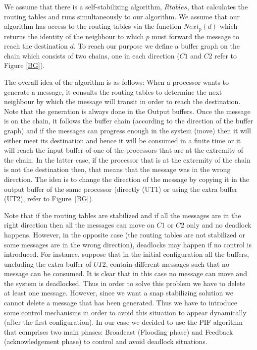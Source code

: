\documentclass{llncs}
\begin{document}
We assume that there is a self-stabilizing algorithm, $Rtables$, that calculates the routing tables and runs simultaneously to our
algorithm. We assume that our algorithm has access to the routing tables
via the function $Next_{p}(d)$ which returns the identity of the neighbour to which $p$ must forward the message to
reach the destination $d$. To reach our purpose we define a buffer graph on the chain which consists of two chains,
one in each direction ($C1$ and $C2$ refer to Figure \ref{BG}). 

The overall idea of the algorithm is as follows: When a processor wants to generate a message, it consults the routing
tables to determine the next neighbour by which the message will transit in order to reach the destination. Note that
the generation is always done in the Output buffers. Once the message is on the chain, it follows the buffer chain
(according to the direction of the buffer graph) and if the messages can progress enough in the system (move) then it
will either meet its destination and hence it will be consumed in a finite time or it will reach the input buffer of
one of the processors that are at the extremity of the chain. In the latter case, if the processor that is at the
extremity of the chain is not the destination then, that means that the message was in the wrong direction. The idea
is to change the direction of the message by copying it in the output buffer of the same processor (directly (UT1) or
using the extra buffer (UT2), refer to Figure~\ref{BG}). 

Note that if the routing tables are stabilized and if all the messages are in the right direction then all the
messages can move on $C1$ or $C2$ only and no deadlock happens. However, in the opposite case (the routing tables are not stabilized or
some messages are in the wrong direction), deadlocks may happen if no control is introduced. For instance, suppose
that in the initial configuration all the buffers, uncluding the extra buffer of $UT2$, contain different messages such that 
no message can be consumed. It is clear that in this case no message can move and the system is deadlocked. Thus in order to solve this problem we
have to delete at least one message. However, since we want a snap stabilizing solution we cannot delete a message
that has been generated. Thus we have to introduce some control mechanisms in order to avoid this situation to appear
dynamically (after the first configuration). In our case we decided to use the PIF algorithm that comprises two main
phases: Broadcast (Flooding phase) and Feedback (acknowledgement phase) to control and avoid deadlock situations.
\end{document}
